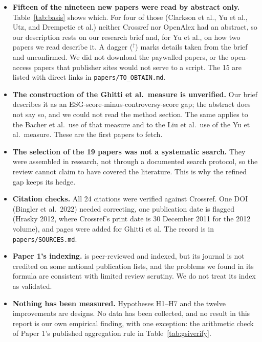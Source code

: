 \documentclass[12pt,a4paper]{article}
\newcommand{\dg}{$^{\dagger}$}          %
\newcommand{\lab}[1]{\textbf{#1}}
\begin{document}
\begin{itemize}
\item \lab{Fifteen of the nineteen new papers were read by abstract only.} Table~\ref{tab:basis}
  shows which. For four of those (Clarkson et al., Yu et al., Utz, and Drempetic et al.) neither
  Crossref nor OpenAlex had an abstract, so our description rests on our research brief and, for
  Yu et al., on how two papers we read describe it. A dagger (\dg) marks details taken from the
  brief and unconfirmed. We did not download the paywalled papers, or the open-access papers that
  publisher sites would not serve to a script. The 15 are listed with direct links in
  \texttt{papers/TO\_OBTAIN.md}.
\item \lab{The construction of the Ghitti et al.\ measure is unverified.} Our brief describes it as
  an ESG-score-minus-controversy-score gap; the abstract does not say so, and we could not read the
  method section. The same applies to the Bacher et al.\ use of that measure and to the Liu et al.\
  use of the Yu et al.\ measure. These are the first papers to fetch.
\item \lab{The selection of the 19 papers was not a systematic search.} They were assembled in
  research, not through a documented search protocol, so the review cannot claim to have covered
  the literature. This is why the refined gap keeps its hedge.
\item \lab{Citation checks.} All 24 citations were verified against Crossref. One DOI (Bingler et
  al.\ 2022) needed correcting, one publication date is flagged (Hrasky 2012, where Crossref's print
  date is 30 December 2011 for the 2012 volume), and pages were added for Ghitti et al. The
  record is in \texttt{papers/SOURCES.md}.
\item \lab{Paper 1's indexing.} \citet{davidescu2026} is peer-reviewed and indexed, but its
  journal is not credited on some national publication lists, and the problems we found in its
  formula are consistent with limited review scrutiny. We do not treat its index as validated.
\item \lab{Nothing has been measured.} Hypotheses H1--H7 and the twelve improvements are designs.
  No data has been collected, and no result in this report is our own empirical finding, with one
  exception: the arithmetic check of Paper 1's published aggregation rule in
  Table~\ref{tab:gsiverify}.
\end{itemize}
\end{document}
